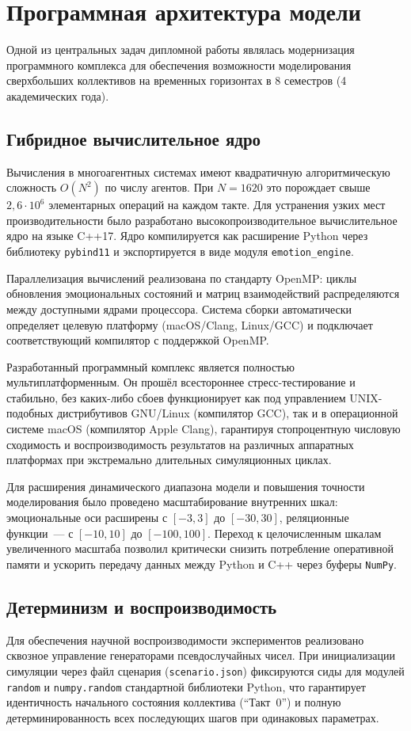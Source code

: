 \documentclass[12pt]{article}
\begin{document}
\clearpage
\section{Программная архитектура модели}

Одной из центральных задач дипломной работы являлась модернизация программного комплекса для обеспечения возможности моделирования сверхбольших коллективов на временных горизонтах в 8 семестров (4 академических года).

\subsection{Гибридное вычислительное ядро}
Вычисления в многоагентных системах имеют квадратичную алгоритмическую сложность $O(N^2)$ по числу агентов. При $N = 1620$ это порождает свыше $2{,}6 \cdot 10^6$ элементарных операций на каждом такте. Для устранения узких мест производительности было разработано высокопроизводительное вычислительное ядро на языке C++17. Ядро компилируется как расширение Python через библиотеку \texttt{pybind11} и экспортируется в виде модуля \texttt{emotion\_engine}.

Параллелизация вычислений реализована по стандарту OpenMP: циклы обновления эмоциональных состояний и матриц взаимодействий распределяются между доступными ядрами процессора. Система сборки автоматически определяет целевую платформу (macOS/Clang, Linux/GCC) и подключает соответствующий компилятор с поддержкой OpenMP.

Разработанный программный комплекс является полностью мультиплатформенным. Он прошёл всестороннее стресс-тестирование и стабильно, без каких-либо сбоев функционирует как под управлением UNIX-подобных дистрибутивов GNU/Linux (компилятор GCC), так и в операционной системе macOS (компилятор Apple Clang), гарантируя стопроцентную числовую сходимость и воспроизводимость результатов на различных аппаратных платформах при экстремально длительных симуляционных циклах.

Для расширения динамического диапазона модели и повышения точности моделирования было проведено масштабирование внутренних шкал: эмоциональные оси расширены с $[-3, 3]$ до $[-30, 30]$, реляционные функции~--- с $[-10, 10]$ до $[-100, 100]$. Переход к целочисленным шкалам увеличенного масштаба позволил критически снизить потребление оперативной памяти и ускорить передачу данных между Python и C++ через буферы \texttt{NumPy}.

\subsection{Детерминизм и воспроизводимость}
Для обеспечения научной воспроизводимости экспериментов реализовано сквозное управление генераторами псевдослучайных чисел. При инициализации симуляции через файл сценария (\texttt{scenario.json}) фиксируются сиды для модулей \texttt{random} и \texttt{numpy.random} стандартной библиотеки Python, что гарантирует идентичность начального состояния коллектива (``Такт~0'') и полную детерминированность всех последующих шагов при одинаковых параметрах.
\end{document}
